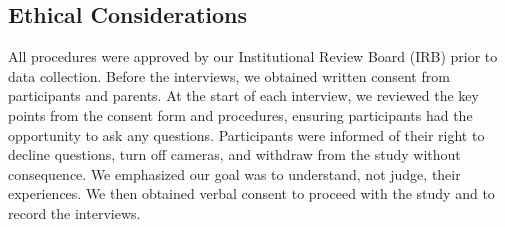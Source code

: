 \subsection{Ethical Considerations}
All procedures were approved by our Institutional Review Board (IRB) prior to data collection. Before the interviews, we obtained written consent from participants and parents. At the start of each interview, we reviewed the key points from the consent form and procedures, ensuring participants had the opportunity to ask any questions. Participants were informed of their right to decline questions, turn off cameras, and withdraw from the study without consequence. We emphasized our goal was to understand, not judge, their experiences. We then obtained verbal consent to proceed with the study and to record the interviews.